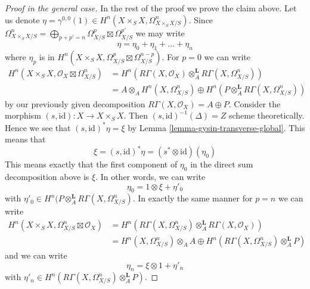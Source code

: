 \begin{proof}[Proof in the general case]
\medskip\noindent
In the rest of the proof we prove the claim above. Let us denote
$\eta = \gamma^{0, 0}(1) \in H^n(X \times_S X, \Omega^n_{X \times_S X/S})$.
Since $\Omega^n_{X \times_S X/S} =
\bigoplus_{p + p' = n} \Omega^p_{X/S} \boxtimes \Omega^{p'}_{X/S}$
we may write
$$
\eta = \eta_0 + \eta_1 + \ldots + \eta_n
$$
where $\eta_p$ is in
$H^n(X \times_S X, \Omega^p_{X/S} \boxtimes \Omega^{n - p}_{X/S})$.
For $p = 0$ we can write
\begin{align*}
H^n(X \times_S X, \mathcal{O}_X \boxtimes \Omega^n_{X/S})
& =
H^n(R\Gamma(X, \mathcal{O}_X) \otimes_A^\mathbf{L}
R\Gamma(X, \Omega^n_{X/S})) \\
& =
A \otimes_A H^n(X, \Omega^n_{X/S}) \oplus
H^n(P \otimes_A^\mathbf{L} R\Gamma(X, \Omega^n_{X/S}))
\end{align*}
by our previously given decomposition $R\Gamma(X, \mathcal{O}_X) = A \oplus P$.
Consider the morphism $(s, \text{id}) : X \to X \times_S X$.
Then $(s, \text{id})^{-1}(\Delta) = Z$ scheme theoretically.
Hence we see that $(s, \text{id})^*\eta = \xi$ by
Lemma \ref{lemma-gysin-transverse-global}. This means that
$$
\xi = (s, \text{id})^*\eta = (s^* \otimes \text{id})(\eta_0)
$$
This means exactly that the first component of $\eta_0$
in the direct sum decomposition above is $\xi$. In other words, we can write
$$
\eta_0 = 1 \otimes \xi + \eta'_0
$$
with $\eta'_0 \in H^n(P \otimes_A^\mathbf{L} R\Gamma(X, \Omega^n_{X/S})$.
In exactly the same manner for $p = n$ we can write
\begin{align*}
H^n(X \times_S X, \Omega^n_{X/S} \boxtimes \mathcal{O}_X)
& =
H^n(R\Gamma(X, \Omega^n_{X/S}) \otimes_A^\mathbf{L}
R\Gamma(X, \mathcal{O}_X)) \\
& =
H^n(X, \Omega^n_{X/S}) \otimes_A A \oplus
H^n(R\Gamma(X, \Omega^n_{X/S}) \otimes_A^\mathbf{L} P)
\end{align*}
and we can write
$$
\eta_n = \xi \otimes 1 + \eta'_n
$$
with $\eta'_n \in H^n(R\Gamma(X, \Omega^n_{X/S}) \otimes_A^\mathbf{L} P)$.


\end{proof}

